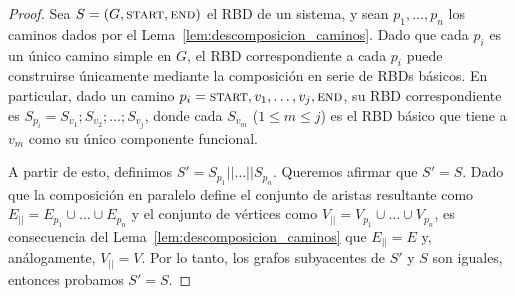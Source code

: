 \begin{proof}
    Sea $S = (G, \textsc{start}, \textsc{end})$ el RBD de un sistema, y sean $p_1, \dots, p_n$ los caminos dados por el Lema~\ref{lem:descomposicion_caminos}. Dado que cada $p_i$ es un único camino simple en $G$, el RBD correspondiente a cada $p_i$ puede construirse únicamente mediante la composición en serie de RBDs básicos. En particular, dado un camino $p_i = \textsc{start}, v_1, \dots, v_j, \textsc{end}$, su RBD correspondiente es $S_{p_i} = S_{v_1} ; S_{v_2} ; \dots ; S_{v_j}$, donde cada $S_{v_m}$ ($1 \le m \le j$) es el RBD básico que tiene a $v_m$ como su único componente funcional.

    A partir de esto, definimos $S' = S_{p_1} || \dots || S_{p_n}$. Queremos afirmar que $S' = S$. Dado que la composición en paralelo define el conjunto de aristas resultante como $E_{||} = E_{p_1} \cup \dots \cup E_{p_n}$ y el conjunto de vértices como $V_{||} = V_{p_1} \cup \dots \cup V_{p_n}$, es consecuencia del Lema~\ref{lem:descomposicion_caminos} que $E_{||} = E$ y, análogamente, $V_{||} = V$. Por lo tanto, los grafos subyacentes de $S'$ y $S$ son iguales, entonces probamos $S' = S$.
\end{proof}
